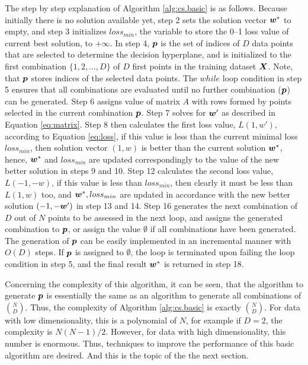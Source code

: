 The step by step explanation of Algorithm \ref{alg:cs.basic} is as follows. Because initially there is no solution available yet, step 2 sets the solution vector $\boldsymbol{w}^*$ to empty, and step 3 initializes $loss_{min}$, the variable to store the 0--1 loss value of current best solution, to $+\infty$. In step 4, $\boldsymbol{p}$ is the set of indices of $D$ data points that are selected to determine the decision hyperplane, and is initialized to the first combination $\{1,2,\dots, D \}$ of $D$ first points in the training dataset $\boldsymbol{X}$. Note, that $\boldsymbol{p}$ stores indices of the selected data points. The $while$ loop condition in step 5 ensures that all combinations are evaluated until no further combination ($\boldsymbol{p}$) can be generated. Step 6 assigns value of  matrix $A$ with rows formed by points selected in the current combination $\boldsymbol{p}$. Step 7 solves for $\boldsymbol{w}'$ as described in Equation \ref{eq:matrix}. Step 8 then calculates the first loss value, $L(1, w')$, according to Equation \ref{eq:loss}, if this value is less than the current minimal loss $loss_{min}$, then solution vector $(1, w)$ is better than the current solution $\boldsymbol{w}^*$, hence, $\boldsymbol{w}^*$ and $loss_{min}$ are updated correspondingly to the value of the new better solution in steps 9 and 10. Step 12 calculates the second loss value, $L(-1, -w)$, if this value is less than $loss_{min}$, then clearly it must be less than $L(1,w)$ too, and $\boldsymbol{w}^*, loss_{min}$ are updated in accordance with the new better solution $(-1, -\boldsymbol{w}')$ in step 13 and 14. Step 16 generates the next combination of $D$ out of $N$ points to be assessed in the next loop, and assigns the generated combination to $\boldsymbol{p}$, or assign the value $\emptyset$ if all combinations have been generated. The generation of $\boldsymbol{p}$ can be easily implemented in an incremental manner with $O(D)$ steps. If $\boldsymbol{p}$ is assigned to $\emptyset$, the loop is terminated upon failing the loop condition in step 5, and the final result $\boldsymbol{w}^*$ is returned in step 18. 

Concerning the complexity of this algorithm, it can be seen, that the algorithm to generate $\boldsymbol{p}$ is essentially the same as an algorithm to generate all combinations of ${N \choose D}$. Thus, the complexity of Algorithm \ref{alg:cs.basic} is exactly ${N \choose D}$. For data with low dimensionality, this is a polynomial of $N$, for example if $D=2$, the complexity is $N(N-1)/2$. However, for data with high dimensionality, this number is enormous. Thus, techniques to improve the performance of this basic algorithm are desired. And this is the topic of the the next section. 

